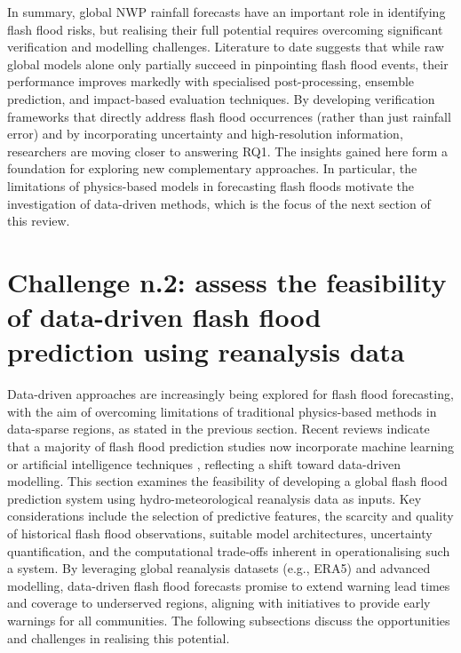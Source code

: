 In summary, global NWP rainfall forecasts have an important role in identifying flash flood risks, but realising their full potential requires overcoming significant verification and modelling challenges. Literature to date suggests that while raw global models alone only partially succeed in pinpointing flash flood events, their performance improves markedly with specialised post-processing, ensemble prediction, and impact-based evaluation techniques. By developing verification frameworks that directly address flash flood occurrences (rather than just rainfall error) and by incorporating uncertainty and high-resolution information, researchers are moving closer to answering RQ1. The insights gained here form a foundation for exploring new complementary approaches. In particular, the limitations of physics-based models in forecasting flash floods motivate the investigation of data-driven methods, which is the focus of the next section of this review.

\section{Challenge n.2: assess the feasibility of data-driven flash flood prediction using reanalysis data}

Data-driven approaches are increasingly being explored for flash flood forecasting, with the aim of overcoming limitations of traditional physics-based methods in data-sparse regions, as stated in the previous section. Recent reviews indicate that a majority of flash flood prediction studies now incorporate machine learning or artificial intelligence techniques \citep{AlRawas2024}, reflecting a shift toward data-driven modelling. This section examines the feasibility of developing a global flash flood prediction system using hydro-meteorological reanalysis data as inputs. Key considerations include the selection of predictive features, the scarcity and quality of historical flash flood observations, suitable model architectures, uncertainty quantification, and the computational trade-offs inherent in operationalising such a system. By leveraging global reanalysis datasets (e.g., ERA5) and advanced modelling, data-driven flash flood forecasts promise to extend warning lead times and coverage to underserved regions, aligning with initiatives to provide early warnings for all communities. The following subsections discuss the opportunities and challenges in realising this potential. 

